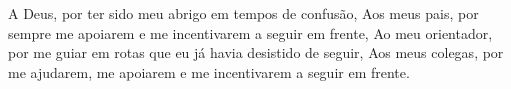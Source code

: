 
\begin{agradecimentos}

A Deus, por ter sido meu abrigo em tempos de confusão,
Aos meus pais, por sempre me apoiarem e me incentivarem a seguir em frente,
Ao meu orientador, por me guiar em rotas que eu já havia desistido de seguir,
Aos meus colegas, por me ajudarem, me apoiarem e me incentivarem a seguir em frente.

\end{agradecimentos}
